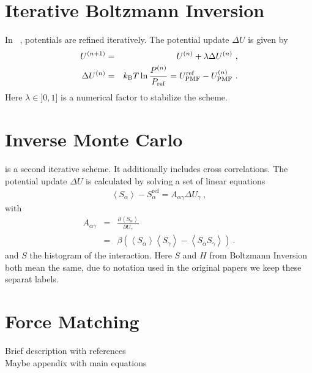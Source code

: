 \section{Iterative Boltzmann Inversion}
In \ibi~\cite{Reith:2003}, potentials are refined iteratively. The potential update $\Delta U$ is given by
\begin{eqnarray}
  \label{eq:iter_boltzmann}
  U^{(n+1)} &=& U^{(n)} + \lambda \Delta U^{(n)}~, \\
  \Delta U^{(n)} &=&  k_\text{B} T \ln  \frac{P^{(n)}}{P_{\rm ref}}
  =  U_\text{PMF}^\text{ref} - U_\text{PMF}^{(n)}~.
\end{eqnarray}
Here $\lambda \in ]0,1]$ is a numerical factor to stabilize the scheme.

\section{Inverse Monte Carlo}
\imc is a second iterative scheme. It additionally includes cross correlations. The potential update $\Delta U$ is calculated by solving a set of linear equations
\begin{align}
    \left<S_{\alpha}\right> - S_{\alpha}^{\text{ref}}= A_{\alpha \gamma} \Delta U_{\gamma}~,
  \label{eq:imc}
\end{align}
%
with
\begin{eqnarray}
  \label{eq:covariance}
  A_{\alpha \gamma} &=& \frac{\partial \left< S_{\alpha} \right> }{\partial U_{\gamma}}  \\
  \nonumber
  &=&
  \beta \left( \left<S_{\alpha} \right>\left<S_{\gamma} \right> - \left<S_{\alpha} S_{\gamma} \right>  \right)~.
  \nonumber
\end{eqnarray}
and $S$ the histogram of the interaction. Here $S$ and $H$ from Boltzmann Inversion both mean the same, due to notation used in the original papers we keep these separat labels.

\section{Force Matching}
\sasha

Brief description with references \\
Maybe appendix with main equations \\
